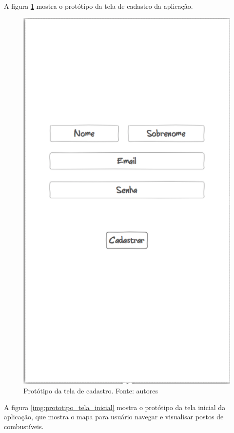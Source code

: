 A figura \ref{img:prototipo_tela_de_cadastro} mostra o protótipo da tela de cadastro da aplicação.
\begin{figure}[H]
    \centering
    \includegraphics[scale=0.5]{figuras/prototipo_cadastro.png}
    \caption[Protótipo da tela de cadastro]{Protótipo da tela de cadastro. Fonte: autores}
    \label{img:prototipo_tela_de_cadastro}
\end{figure}
 \pagebreak
A figura \ref{img:prototipo_tela_inicial} mostra o protótipo da tela inicial da aplicação, que mostra o mapa para usuário navegar e visualisar postos de combustíveis.

